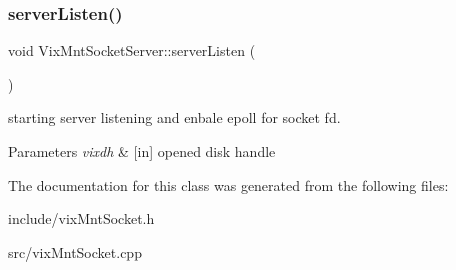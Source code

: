 \subsubsection{\texorpdfstring{server\+Listen()}{serverListen()}}
{\ttfamily void Vix\+Mnt\+Socket\+Server\+::server\+Listen (\begin{DoxyParamCaption}\item[{std\+::map$<$ std\+::string, \hyperlink{class_vix_mnt_disk_handle}{Vix\+Mnt\+Disk\+Handle} $\ast$ $>$ \&}]{ }\end{DoxyParamCaption})}



starting server listening and enbale epoll for socket fd. 


\begin{DoxyParams}{Parameters}
{\em vixdh} & \mbox{[}in\mbox{]} opened disk handle \\
\hline
\end{DoxyParams}


The documentation for this class was generated from the following files\+:\begin{DoxyCompactItemize}
\item 
include/vix\+Mnt\+Socket.\+h\item 
src/vix\+Mnt\+Socket.\+cpp\end{DoxyCompactItemize}
